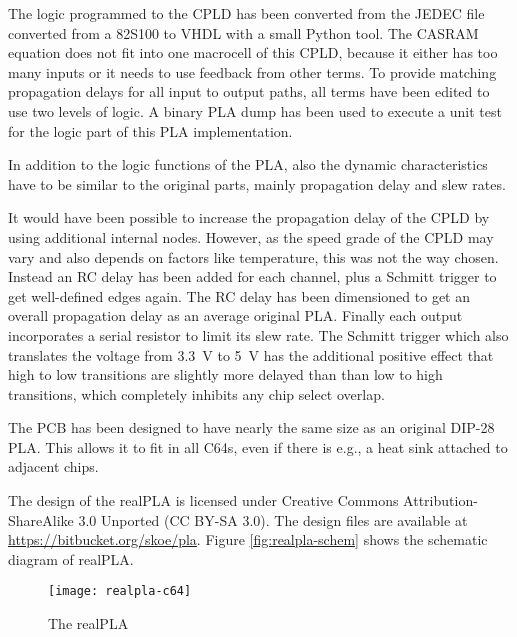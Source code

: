 The logic programmed to the CPLD has been converted from the JEDEC file
converted from a 82S100 to VHDL with a small Python tool. The CASRAM
equation does not fit into one macrocell of this CPLD, because it either has
too many inputs or it needs to use feedback from other terms. To provide
matching propagation delays for all input to output paths, all terms have
been edited to use two levels of logic. A binary PLA dump has been used to
execute a unit test for the logic part of this PLA implementation.

In addition to the logic functions of the PLA, also the dynamic
characteristics have to be similar to the original parts, mainly propagation
delay and slew rates.

It would have been possible to increase the propagation delay of the CPLD by
using additional internal nodes. However, as the speed grade of the CPLD may
vary and also depends on factors like temperature, this was not the way
chosen. Instead an RC delay has been added for each channel, plus a Schmitt
trigger to get well-defined edges again. The RC delay has been dimensioned
to get an overall propagation delay as an average original PLA. Finally each
output incorporates a serial resistor to limit its slew rate. The Schmitt
trigger which also translates the voltage from \SI{3.3}{\volt} to \SI{5}{
\volt} has the additional positive effect that high to low transitions are
slightly more delayed than than low to high transitions, which completely
inhibits any chip select overlap.

The PCB has been designed to have nearly the same size as an original DIP-28
PLA. This allows it to fit in all C64s, even if there is e.g., a heat sink
attached to adjacent chips.

The design of the realPLA is licensed under Creative Commons
Attribution-ShareAlike 3.0 Unported (CC BY-SA 3.0). The design files are
available at \url{https://bitbucket.org/skoe/pla}.
Figure \ref{fig:realpla-schem} shows the schematic diagram of realPLA.


\begin{figure}
    \centering
    \texttt{[image: realpla-c64]}
    \caption{The realPLA}
    \label{fig:realpla-c64}
\end{figure}


\begin{sidewaysfigure}
\centering
{}
\caption{realPLA schematic diagram}
\label{fig:realpla-schem}
\end{sidewaysfigure}



